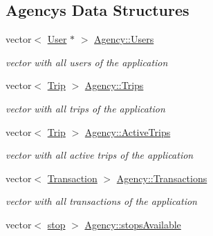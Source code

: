 \subsection*{Agency\textquotesingle{}s Data Structures}
\begin{DoxyCompactItemize}
\item 
\mbox{\label{group___agency_gabb9747ae5d2295ed8bbbc6a8a5e999c4}} 
vector$<$ \hyperlink{class_user}{User} $\ast$ $>$ \hyperlink{group___agency_gabb9747ae5d2295ed8bbbc6a8a5e999c4}{Agency\+::\+Users}
\begin{DoxyCompactList}\small\item\em vector with all users of the application \end{DoxyCompactList}\item 
\mbox{\label{group___agency_gabf415574ea1affe9c8d956d414d8ae2f}} 
vector$<$ \hyperlink{class_trip}{Trip} $>$ \hyperlink{group___agency_gabf415574ea1affe9c8d956d414d8ae2f}{Agency\+::\+Trips}
\begin{DoxyCompactList}\small\item\em vector with all trips of the application \end{DoxyCompactList}\item 
\mbox{\label{group___agency_gaa139f4e94c0d903fe15541b17286f1ab}} 
vector$<$ \hyperlink{class_trip}{Trip} $>$ \hyperlink{group___agency_gaa139f4e94c0d903fe15541b17286f1ab}{Agency\+::\+Active\+Trips}
\begin{DoxyCompactList}\small\item\em vector with all active trips of the application \end{DoxyCompactList}\item 
\mbox{\label{group___agency_ga238bb9d83a344aab5b299ee39cb592fa}} 
vector$<$ \hyperlink{class_transaction}{Transaction} $>$ \hyperlink{group___agency_ga238bb9d83a344aab5b299ee39cb592fa}{Agency\+::\+Transactions}
\begin{DoxyCompactList}\small\item\em vector with all transactions of the application \end{DoxyCompactList}\item 
\mbox{\label{group___agency_ga5d27f85795249e51708fdc5b913678f3}} 
vector$<$ \hyperlink{structstop}{stop} $>$ \hyperlink{group___agency_ga5d27f85795249e51708fdc5b913678f3}{Agency\+::stops\+Available}

\end{DoxyCompactItemize}

